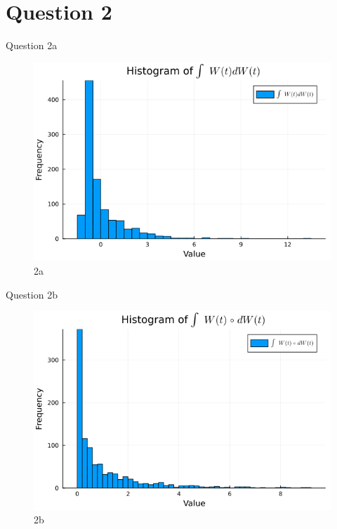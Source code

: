 \documentclass[compress,12pt]{beamer}
\begin{document}
\section{Question 2}
\begin{frame}{Question 2a}

      \begin{figure}[H]
            \centering
            \includegraphics[scale=0.5]{imgs/2a.png}
            \caption{2a}
            \label{fig:2a}
      \end{figure}

\end{frame}

\begin{frame}{Question 2b}

      \begin{figure}[H]
            \centering
            \includegraphics[scale=0.5]{imgs/2b.png}
            \caption{2b}
            \label{fig:2b}
      \end{figure}
\end{frame}
\end{document}
